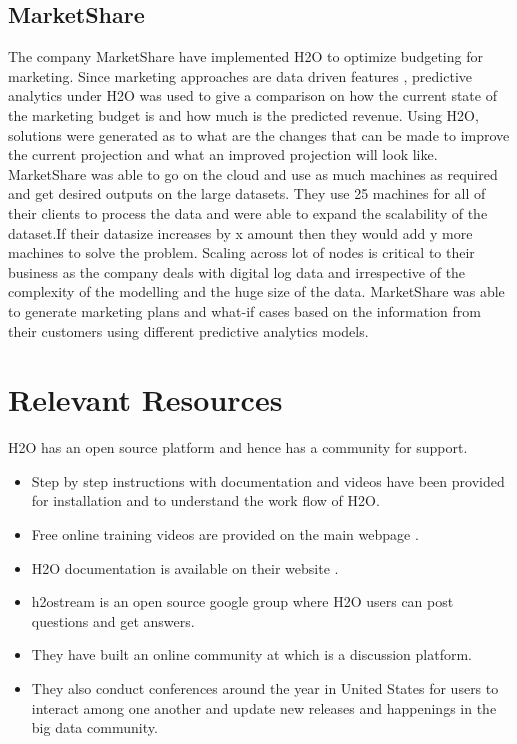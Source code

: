 \documentclass[9pt,twocolumn,twoside]{../../styles/osajnl}
\begin{document}
\subsection {MarketShare}

The company MarketShare have implemented H2O to optimize budgeting for
marketing. Since marketing approaches are data driven features ,
predictive analytics under H2O was used to give a comparison on how
the current state of the marketing budget is and how much is the
predicted revenue\cite{www-h2o-marketshare}. Using H2O, solutions were generated as to what are
the changes that can be made to improve the current projection and
what an improved projection will look like. MarketShare was able to go on the cloud and use as much
machines as required and get desired outputs on the large
datasets. They use 25 machines for all of their clients to process the
data and were able to expand the scalability of the dataset.If their
datasize increases by x amount then they would add y more machines to
solve the problem\cite{www-h2o-marketshare}. Scaling across lot of nodes is critical to their
business as the company deals with digital log data and irrespective
of the complexity of the modelling and the huge size of the data\cite{www-h2o-marketshare}. MarketShare was able to generate marketing plans and what-if cases based on the information from their customers using different predictive analytics models.

\section {Relevant Resources}

H2O has an open source platform and hence has a community for support.
\begin{itemize}
\item Step by step instructions with documentation and videos have
   been provided for installation and to understand the work flow of
   H2O\cite{www-h2o-webpage}.
\item Free online training videos are provided on the main webpage
  \cite{www-h2o-learn}.
\item H2O documentation is available on their website
  \cite{www-h2o-webpage}.
\item h2ostream is an open source google group where H2O users can
    post questions and get answers.
\item They have built an online community at\cite{www-h2o-community}
  which is a discussion platform.
\item They also conduct conferences around the year in United States
    for users to interact among one another and update new releases
    and happenings in the big data community\cite{www-h2o-meetups}.
\end{itemize}
\end{document}

